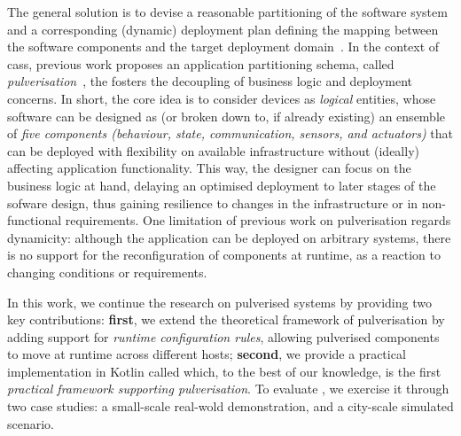 \documentclass[conference]{IEEEtran}
\newcommand{\meta}[1]{{\color{blue}#1}}
\begin{document}
The general solution is to devise 
 a reasonable partitioning of the software system
 and a corresponding (dynamic) deployment plan 
 defining the mapping between the software components and the target deployment domain~\cite{DBLP:journals/jss/ArcangeliBL15}.
%
In the context of \acp{cas},
 previous work proposes an application partitioning schema,
 called \emph{pulverisation}~\cite{FI2020-pulverization},
 the fosters the decoupling of business logic and deployment concerns.
%
In short, the core idea is to consider devices as \emph{logical} entities,
whose software can be designed as (or broken down to, if already existing) an ensemble of \emph{five components
(behaviour, state, communication, sensors, and actuators)}
 that can be deployed with flexibility on available infrastructure without (ideally) affecting application functionality. %
%
This way, the designer can focus on the business logic at hand,
delaying an optimised deployment to later stages of the sofware design,
thus gaining resilience to changes in the infrastructure or in non-functional requirements.
%
One limitation of previous work on pulverisation regards dynamicity:
although the application can be deployed on arbitrary systems,
there is no support for the reconfiguration of components at runtime, as a reaction to changing conditions or requirements.

In this work,
we continue the research on pulverised systems by providing two key contributions:
\textbf{first}, we extend the theoretical framework of pulverisation by adding support for
\emph{runtime configuration rules}, allowing pulverised components to move at runtime across different hosts;
\textbf{second}, we provide a practical implementation in Kotlin called \ourframework{} which,
to the best of our knowledge,
is the first \emph{practical framework supporting pulverisation}. %
%
To evaluate \ourframework{}, we exercise it through two case studies:
a small-scale real-wold demonstration, and a city-scale simulated scenario.

\end{document}
